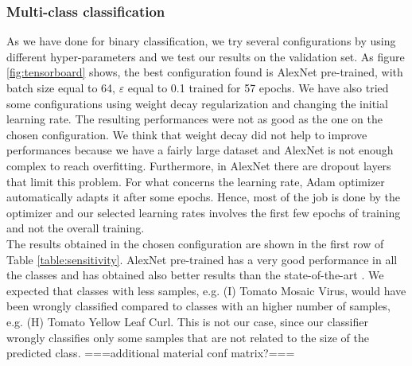 \subsubsection{Multi-class classification}
As we have done for binary classification, we try several configurations by using different hyper-parameters and we test our results on the validation set. As figure \ref{fig:tensorboard} shows, the best configuration found is AlexNet pre-trained, with batch size equal to 64, $\varepsilon$ equal to 0.1 trained for 57 epochs. We have also tried some configurations using weight decay regularization and changing the initial learning rate. The resulting performances were not as good as the one on the chosen configuration. We think that weight decay did not help to improve performances because we have a fairly large dataset and AlexNet is not enough complex to reach overfitting. Furthermore, in AlexNet there are dropout layers that limit this problem. For what concerns the learning rate, Adam optimizer \cite{ref32} automatically adapts it after some epochs. Hence, most of the job is done by the optimizer and our selected learning rates involves the first few epochs of training and not the overall training.
\\
The results obtained in the chosen configuration are shown in the first row of Table \ref{table:sensitivity}. AlexNet pre-trained has a very good performance in all the classes and has obtained also better results than the state-of-the-art \cite{ref11}. We expected that classes with less samples, e.g. (I) Tomato Mosaic Virus, would have been wrongly classified compared to classes with an higher number of samples, e.g. (H) Tomato Yellow Leaf Curl. This is not our case, since our classifier wrongly classifies only some samples that are not related to the size of the predicted class. ===additional material conf matrix?===
